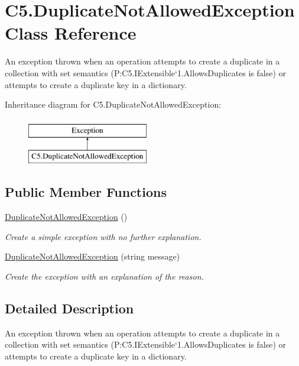\hypertarget{class_c5_1_1_duplicate_not_allowed_exception}{}\section{C5.\+Duplicate\+Not\+Allowed\+Exception Class Reference}
\label{class_c5_1_1_duplicate_not_allowed_exception}


An exception thrown when an operation attempts to create a duplicate in a collection with set semantics (P\+:\+C5.\+I\+Extensible`1.\+Allows\+Duplicates is false) or attempts to create a duplicate key in a dictionary.  


Inheritance diagram for C5.\+Duplicate\+Not\+Allowed\+Exception\+:\begin{figure}[H]
\begin{center}
\leavevmode
\includegraphics[height=2.000000cm]{class_c5_1_1_duplicate_not_allowed_exception}
\end{center}
\end{figure}
\subsection*{Public Member Functions}
\begin{DoxyCompactItemize}
\item 
\hyperlink{class_c5_1_1_duplicate_not_allowed_exception_a57f60c225b3ef8850b3c56e1f3089e60}{Duplicate\+Not\+Allowed\+Exception} ()
\begin{DoxyCompactList}\small\item\em Create a simple exception with no further explanation. \end{DoxyCompactList}\item 
\hyperlink{class_c5_1_1_duplicate_not_allowed_exception_a674b91b55cfad4db40a204efecfa1449}{Duplicate\+Not\+Allowed\+Exception} (string message)
\begin{DoxyCompactList}\small\item\em Create the exception with an explanation of the reason. \end{DoxyCompactList}\end{DoxyCompactItemize}


\subsection{Detailed Description}
An exception thrown when an operation attempts to create a duplicate in a collection with set semantics (P\+:\+C5.\+I\+Extensible`1.\+Allows\+Duplicates is false) or attempts to create a duplicate key in a dictionary. 

